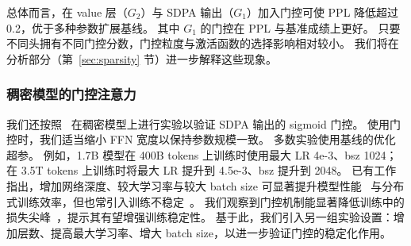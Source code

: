 \documentclass{article} %
\begin{document}
总体而言，在 value 层（$G_2$）与 SDPA 输出（$G_1$）加入门控可使 PPL 降低超过 0.2，优于多种参数扩展基线。
其中 $G_1$ 的门控在 PPL 与基准成绩上更好。
只要不同头拥有不同门控分数，门控粒度与激活函数的选择影响相对较小。
我们将在分析部分（第~\ref{sec:sparsity} 节）进一步解释这些现象。


\subsubsection{稠密模型的门控注意力}
\label{sec:dense-exp}


我们还按照~\citep{yang2024qwen2} 在稠密模型上进行实验以验证 SDPA 输出的 sigmoid 门控。
使用门控时，我们适当缩小 FFN 宽度以保持参数规模一致。
多数实验使用基线的优化超参。
例如，1.7B 模型在 400B tokens 上训练时使用最大 LR 4e-3、bsz 1024；在 3.5T tokens 上训练时将最大 LR 提升到 4.5e-3、bsz 提升到 2048。
已有工作指出，增加网络深度、较大学习率与较大 batch size 可显著提升模型性能~\citep{mccandlish2018empirical, wang2022deepnetscalingtransformers1000, d2024we} 与分布式训练效率，但也常引入训练不稳定~\citep{wang2022deepnetscalingtransformers1000,zeng2022glm, takase2023spike}。
我们观察到门控机制能显著降低训练中的损失尖峰~\citep{chowdhery2023palm, takase2023spike}，提示其有望增强训练稳定性。
基于此，我们引入另一组实验设置：增加层数、提高最大学习率、增大 batch size，以进一步验证门控的稳定化作用。
\end{document}
